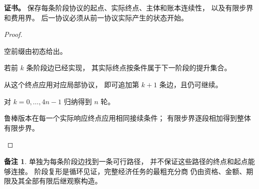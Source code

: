 \documentclass[UTF8,12pt,a4paper,openany,fontset=none,zihao=false]{ctexrep}
\theoremstyle{definition}
\newtheorem{remark}{备注}[chapter]
\newenvironment{certificate}{\par\noindent\textbf{证书。}\ignorespaces}{\par}
\newcommand{\1}{\mathbf 1}
\begin{document}
\begin{certificate}
保存每条阶段协议的起点、实际终点、主体和账本连续性，
以及有限步界和费用界。
后一协议必须从前一协议实际产生的状态开始。
\end{certificate}
\begin{proof}
\begin{semanticsteps}
\item 空前缀由初态给出。
\item 若前 \(k\) 条阶段边已经实现，
其实际终点按条件属于下一阶段的提升集合。
\item 从这个终点应用对应局部协议，
即可追加第 \(k+1\) 条边，且仍可继续。
\item 对 \(k=0,\ldots,4n-1\) 归纳得到 \(n\) 轮。
\item 鲁棒版本在每一个实际响应终点应用相同接续条件；
有限步界逐段相加得到整体有限步界。
\end{semanticsteps}
\end{proof}
\begin{remark}
单独为每条阶段边找到一条可行路径，
并不保证这些路径的终点和起点能够连接。
阶段复形是循环见证，完整经济任务的最粗充分商
仍由资格、金额、期限及其全部有限后继观察构造。
\end{remark}
\end{document}
